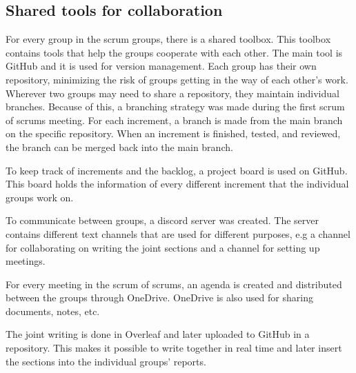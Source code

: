 \subsection{Shared tools for collaboration}\label{sub:shared-tools-for-collaboration}
For every group in the scrum groups, there is a shared toolbox.
This toolbox contains tools that help the groups cooperate with each other.
The main tool is GitHub and it is used for version management.  
Each group has their own repository, minimizing the risk of groups getting in the way of each other's work.
Wherever two groups may need to share a repository, they maintain individual branches.
Because of this, a branching strategy was made during the first scrum of scrums meeting.
For each increment, a branch is made from the main branch on the specific repository. 
When an increment is finished, tested, and reviewed, the branch can be merged back into the main branch.

To keep track of increments and the backlog, a project board is used on GitHub.
This board holds the information of every different increment that the individual groups work on.

To communicate between groups, a discord server was created.
The server contains different text channels that are used for different purposes, e.g a channel for collaborating on writing the joint sections and a channel for setting up meetings.

For every meeting in the scrum of scrums, an agenda is created and distributed between the groups through OneDrive.
OneDrive is also used for sharing documents, notes, etc.

The joint writing is done in Overleaf and later uploaded to GitHub in a repository.
This makes it possible to write together in real time and later insert the sections into the individual groups' reports.

